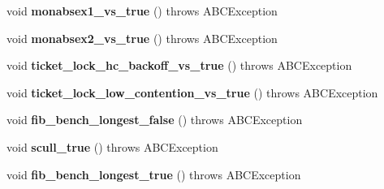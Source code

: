\begin{DoxyCompactItemize}
\item 
\hypertarget{classedu_1_1udel_1_1cis_1_1vsl_1_1civl_1_1PthreadCProverTest_ab29e83d0f9209bab9d4df378ca26c9b6}{}void {\bfseries monabsex1\+\_\+vs\+\_\+true} ()  throws A\+B\+C\+Exception \label{classedu_1_1udel_1_1cis_1_1vsl_1_1civl_1_1PthreadCProverTest_ab29e83d0f9209bab9d4df378ca26c9b6}

\item 
\hypertarget{classedu_1_1udel_1_1cis_1_1vsl_1_1civl_1_1PthreadCProverTest_a5488638002baaab6fa4e02f39232c5e7}{}void {\bfseries monabsex2\+\_\+vs\+\_\+true} ()  throws A\+B\+C\+Exception \label{classedu_1_1udel_1_1cis_1_1vsl_1_1civl_1_1PthreadCProverTest_a5488638002baaab6fa4e02f39232c5e7}

\item 
\hypertarget{classedu_1_1udel_1_1cis_1_1vsl_1_1civl_1_1PthreadCProverTest_a5712321ef38e1bde96aedd17efe4f509}{}void {\bfseries ticket\+\_\+lock\+\_\+hc\+\_\+backoff\+\_\+vs\+\_\+true} ()  throws A\+B\+C\+Exception \label{classedu_1_1udel_1_1cis_1_1vsl_1_1civl_1_1PthreadCProverTest_a5712321ef38e1bde96aedd17efe4f509}

\item 
\hypertarget{classedu_1_1udel_1_1cis_1_1vsl_1_1civl_1_1PthreadCProverTest_a09551e246132360dd08074aeb970c2a3}{}void {\bfseries ticket\+\_\+lock\+\_\+low\+\_\+contention\+\_\+vs\+\_\+true} ()  throws A\+B\+C\+Exception \label{classedu_1_1udel_1_1cis_1_1vsl_1_1civl_1_1PthreadCProverTest_a09551e246132360dd08074aeb970c2a3}

\item 
\hypertarget{classedu_1_1udel_1_1cis_1_1vsl_1_1civl_1_1PthreadCProverTest_a743f32c81cdfea8259c9c200ac9b5b57}{}void {\bfseries fib\+\_\+bench\+\_\+longest\+\_\+false} ()  throws A\+B\+C\+Exception \label{classedu_1_1udel_1_1cis_1_1vsl_1_1civl_1_1PthreadCProverTest_a743f32c81cdfea8259c9c200ac9b5b57}

\item 
\hypertarget{classedu_1_1udel_1_1cis_1_1vsl_1_1civl_1_1PthreadCProverTest_a70bcb1ecdceeb3d2d4103e61fde545f8}{}void {\bfseries scull\+\_\+true} ()  throws A\+B\+C\+Exception \label{classedu_1_1udel_1_1cis_1_1vsl_1_1civl_1_1PthreadCProverTest_a70bcb1ecdceeb3d2d4103e61fde545f8}

\item 
\hypertarget{classedu_1_1udel_1_1cis_1_1vsl_1_1civl_1_1PthreadCProverTest_a4412ba8322068c6e367aa18a96e96e83}{}void {\bfseries fib\+\_\+bench\+\_\+longest\+\_\+true} ()  throws A\+B\+C\+Exception \label{classedu_1_1udel_1_1cis_1_1vsl_1_1civl_1_1PthreadCProverTest_a4412ba8322068c6e367aa18a96e96e83}

\end{DoxyCompactItemize}
